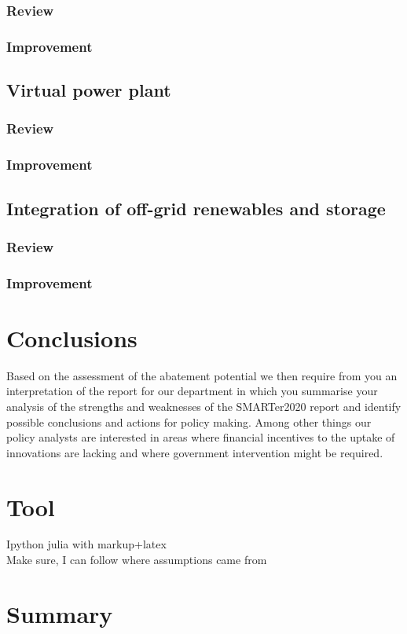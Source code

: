 \documentclass[11pt, twocolumn]{article}
\begin{document}
\subsubsection{Review}
\subsubsection{Improvement}

\subsection{Virtual power plant}
\subsubsection{Review}
\subsubsection{Improvement}

\subsection{Integration of off-grid renewables and storage}
\subsubsection{Review}
\subsubsection{Improvement}

\section{Conclusions}
Based on the assessment of the abatement potential we then require from you an interpretation of the report for our department in which you summarise your analysis of the strengths and weaknesses of the SMARTer2020 report and identify possible conclusions and actions for policy making. Among other things our policy analysts are interested in areas where financial incentives to the uptake of innovations are lacking and where government intervention might be required.

\section{Tool}
Ipython julia with markup+latex\\
Make sure, I can follow where assumptions came from

\section{Summary}
\end{document}
